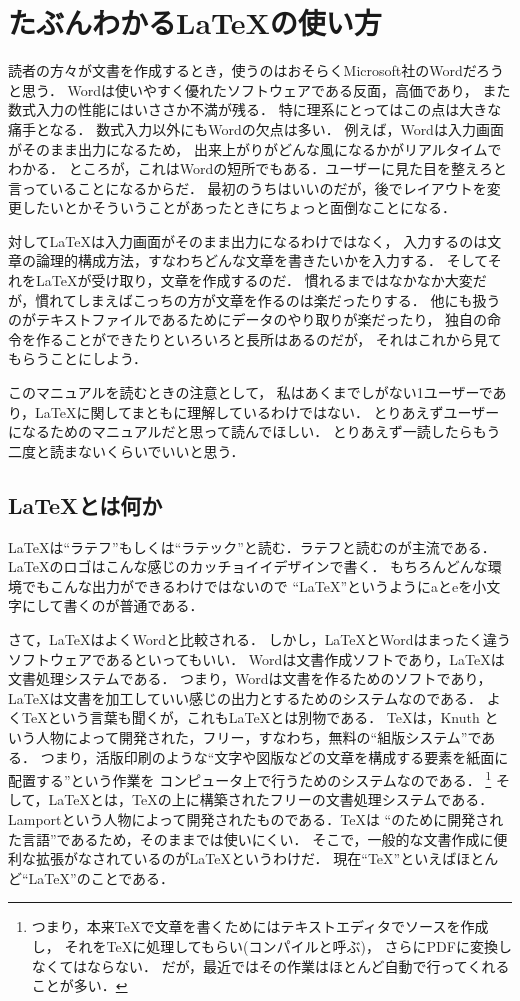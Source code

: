 \chapter{たぶんわかる{\LaTeX}の使い方}
読者の方々が文書を作成するとき，使うのはおそらくMicrosoft社のWordだろうと思う．
Wordは使いやすく優れたソフトウェアである反面，高価であり，
また数式入力の性能にはいささか不満が残る．
特に理系にとってはこの点は大きな痛手となる．
数式入力以外にもWordの欠点は多い．
例えば，Wordは入力画面がそのまま出力になるため，
出来上がりがどんな風になるかがリアルタイムでわかる．
ところが，これはWordの短所でもある．ユーザーに見た目を整えろと言っていることになるからだ．
最初のうちはいいのだが，後でレイアウトを変更したいとかそういうことがあったときにちょっと面倒なことになる．

対して{\LaTeX}は入力画面がそのまま出力になるわけではなく，
入力するのは文章の論理的構成方法，すなわちどんな文章を書きたいかを入力する．
そしてそれを{\LaTeX}が受け取り，文章を作成するのだ．
慣れるまではなかなか大変だが，慣れてしまえばこっちの方が文章を作るのは楽だったりする．
他にも扱うのがテキストファイルであるためにデータのやり取りが楽だったり，
独自の命令を作ることができたりといろいろと長所はあるのだが，
それはこれから見てもらうことにしよう．

このマニュアルを読むときの注意として，
私はあくまでしがない1ユーザーであり，{\LaTeX}に関してまともに理解しているわけではない．
とりあえずユーザーになるためのマニュアルだと思って読んでほしい．
とりあえず一読したらもう二度と読まないくらいでいいと思う．


\section{{\LaTeX}とは何か}
{\LaTeX}は``ラテフ''もしくは``ラテック''と読む．ラテフと読むのが主流である．
{\LaTeX}のロゴはこんな感じのカッチョイイデザインで書く．
もちろんどんな環境でもこんな出力ができるわけではないので
``LaTeX''というようにaとeを小文字にして書くのが普通である．

さて，{\LaTeX}はよくWordと比較される．
しかし，{\LaTeX}とWordはまったく違うソフトウェアであるといってもいい．
Wordは文書作成ソフトであり，{\LaTeX}は文書処理システムである．
つまり，Wordは文書を作るためのソフトであり，
{\LaTeX}は文書を加工していい感じの出力とするためのシステムなのである．
よく{\TeX}という言葉も聞くが，これも{\LaTeX}とは別物である．
{\TeX}は，Knuth
という人物によって開発された，フリー，すなわち，無料の``組版システム''である． 
つまり，活版印刷のような``文字や図版などの文章を構成する要素を紙面に配置する''という作業を
コンピュータ上で行うためのシステムなのである．
\footnote{つまり，本来{\TeX}で文章を書くためにはテキストエディタでソースを作成し，
それを{\TeX}に処理してもらい(コンパイルと呼ぶ)，
さらにPDFに変換しなくてはならない．
だが，最近ではその作業はほとんど自動で行ってくれることが多い．}
そして，{\LaTeX}とは，{\TeX}の上に構築されたフリーの文書処理システムである．
Lamportという人物によって開発されたものである．{\TeX}は
``のために開発された言語''であるため，そのままでは使いにくい．
そこで，一般的な文書作成に便利な拡張がなされているのが{\LaTeX}というわけだ．
現在``{\TeX}''といえばほとんど``{\LaTeX}''のことである．

